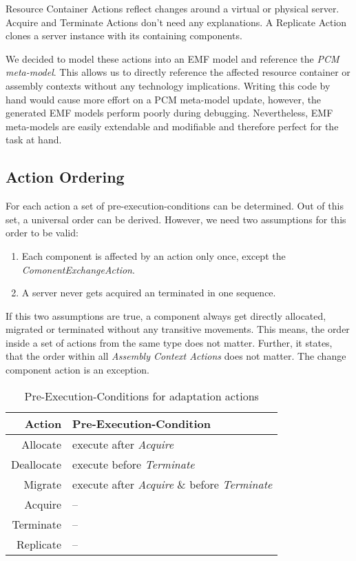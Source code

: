 Resource Container Actions reflect changes around a virtual or physical server. Acquire and Terminate Actions don't need any explanations. A Replicate Action clones a server instance with its containing components.

We decided to model these actions into an EMF model and reference the \textit{PCM meta-model}. This allows us to directly reference the affected resource container or assembly contexts without any technology implications. Writing this code by hand would cause more effort on a PCM meta-model update, however, the generated EMF models perform poorly during debugging. Nevertheless, EMF meta-models are easily extendable and modifiable and therefore perfect for the task at hand.

\subsection{Action Ordering}

For each action a set of pre-execution-conditions can be determined. Out of this set, a universal order can be derived. However, we need two assumptions for this order to be valid:
\begin{enumerate}
	\setlength\itemsep{0em}
	\item Each component is affected by an action only once, except the \textit{ComonentExchangeAction}.
	\item A server never gets acquired an terminated in one sequence.
\end{enumerate}

If this two assumptions are true, a component always get directly allocated, migrated or terminated without any transitive movements. This means, the order inside a set of actions from the same type does not matter. Further, it states, that the order within all \textit{Assembly Context Actions} does not matter. The change component action is an exception.

\begin{table}[h]
	\centering
	\begin{tabular}{r | l}
		\hline
		\textbf{Action} & \textbf{Pre-Execution-Condition} \\
		\hline
		Allocate & execute after \textit{Acquire} \\
		Deallocate & execute before \textit{Terminate} \\
		Migrate & execute after \textit{Acquire} \& before \textit{Terminate} \\
		Acquire & -- \\
		Terminate & -- \\
		Replicate & -- \\
		\hline
	\end{tabular}
	\caption{Pre-Execution-Conditions for adaptation actions}
	\label{tab:SysAdap:cond}
\end{table}


